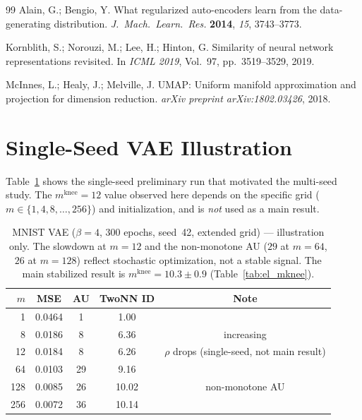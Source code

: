 \documentclass[make,article,submit,pdftex,moreauthors]{Definitions/mdpi}
\newcommand{\mknee}{m^{\mathrm{knee}}}
\begin{document}
\begin{thebibliography}{99}
Alain, G.; Bengio, Y.
What regularized auto-encoders learn from the data-generating distribution.
\textit{J.~Mach.~Learn.~Res.} \textbf{2014}, \textit{15}, 3743--3773.

Kornblith, S.; Norouzi, M.; Lee, H.; Hinton, G.
Similarity of neural network representations revisited.
In \textit{ICML 2019}, Vol.~97, pp.~3519--3529, 2019.

McInnes, L.; Healy, J.; Melville, J.
UMAP: Uniform manifold approximation and projection for dimension reduction.
\textit{arXiv preprint arXiv:1802.03426}, 2018.

\end{thebibliography}

\appendix

\section{Single-Seed VAE Illustration}\label{app:vae_single_seed}

Table~\ref{tab:e4_vae} shows the single-seed preliminary run that motivated
the multi-seed study.
The $\mknee=12$ value observed here depends on the specific grid
($m\in\{1,4,8,\ldots,256\}$) and initialization, and is \emph{not} used as a
main result.

\begin{table}[H]
\centering
\caption{MNIST VAE ($\beta=4$, 300 epochs, seed~42, extended grid) — illustration only.
The slowdown at $m=12$ and the non-monotone AU ($29$ at $m=64$, $26$ at $m=128$)
reflect stochastic optimization, not a stable signal.
The main stabilized result is $\mknee=10.3\pm0.9$ (Table~\ref{tab:el_mknee}).}
\label{tab:e4_vae}
\small
\begin{tabular}{rcccc}
\toprule
$m$ & MSE & AU & TwoNN ID & Note \\
\midrule
1   & 0.0464 & 1  & 1.00  & \\
8   & 0.0186 & 8  & 6.36  & increasing \\
12  & 0.0184 & 8  & 6.26  & $\rho$ drops (single-seed, not main result) \\
64  & 0.0103 & 29 & 9.16  & \\
128 & 0.0085 & 26 & 10.02 & non-monotone AU \\
256 & 0.0072 & 36 & 10.14 & \\
\bottomrule
\end{tabular}
\end{table}
\end{document}

